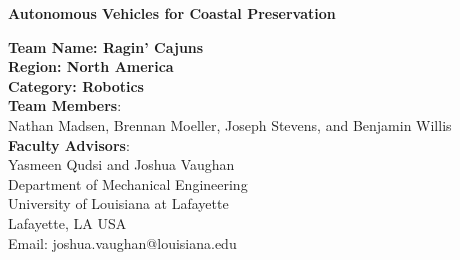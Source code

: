 \documentclass[12 pt]{article}
\begin{document}
\begin{center}
{\LARGE \bf Autonomous Vehicles for Coastal Preservation}

\textbf{Team Name: Ragin' Cajuns}\\
\textbf{Region: North America}\\
\textbf{Category: Robotics}\\
\textbf{Team Members}:\\Nathan Madsen, Brennan Moeller, Joseph Stevens, and Benjamin Willis\\
\vspace{0.1in}
\textbf{Faculty Advisors}:\\Yasmeen Qudsi and Joshua Vaughan \\

\vspace{0.1in}
\footnotesize{Department of Mechanical Engineering\\
University of Louisiana at Lafayette\\
Lafayette, LA USA\\
Email: joshua.vaughan@louisiana.edu}
\end{center}



\pagestyle{plain}
\cfoot{\thepage}

\begin{abstract}
\vspace{-0.2in}
The work proposed here seeks to improve the safety and efficiency of autonomous surface vessels used to monitor wetlands through the addition of an OAK-D camera. The OAK-D would increase the efficiency of the autonomous system by reducing the computational load on the on-board computers, thereby increasing the computational power available for both the scientific mission on the boat and the addition of more peripherals to enhance the safety. This addition would also help improve the localization precision the surface vessel by enabling more sensors, such as LiDAR, to be added with the same computational resources and power requirements. The overall system would be able to achieve safer and more efficient coastal monitoring with the addition of an OAK-D camera. 
\end{abstract}
\end{document}
